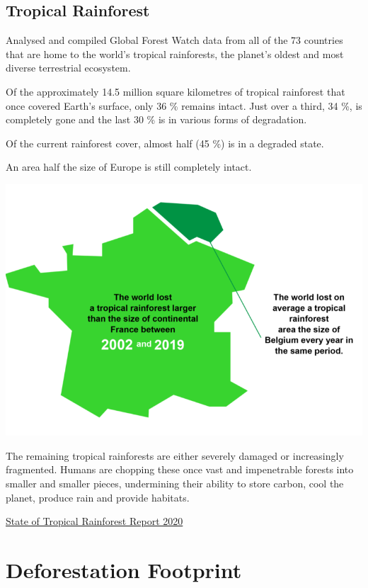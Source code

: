 \documentclass[
]{book}
\begin{document}
\hypertarget{tropical-rainforest}{%
\subsection{Tropical Rainforest}\label{tropical-rainforest}}

Analysed and compiled Global Forest Watch data from all of the 73 countries
that are home to the world's tropical rainforests,
the planet's oldest and most diverse terrestrial ecosystem.

Of the approximately 14.5 million square kilometres of tropical rainforest that once covered Earth's surface, only 36 \% remains intact. Just over a third, 34 \%, is completely gone and the last 30 \% is in various forms of degradation.

Of the current rainforest cover, almost half (45 \%) is in a degraded state.

An area half the size of Europe is still completely intact.

\includegraphics{fig/rainforest_loss_as_france_belgium.png}

The remaining tropical rainforests are either severely damaged or increasingly fragmented.
Humans are chopping these once vast and impenetrable forests into smaller and smaller pieces,
undermining their ability to store carbon, cool the planet, produce rain and provide habitats.

\href{https://www.regnskog.no/en/news/only-half-of-the-worlds-rainforests-remains-intact}{State of Tropical Rainforest Report 2020}

\hypertarget{deforestation-footprint}{%
\section{Deforestation Footprint}\label{deforestation-footprint}}
\end{document}
